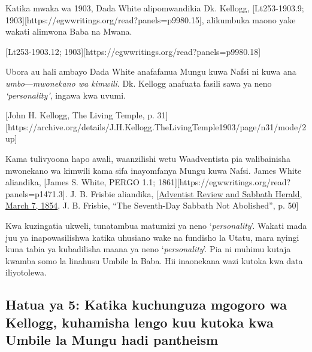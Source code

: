Katika mwaka wa 1903, Dada White alipomwandikia Dk. Kellogg, [Lt253-1903.9; 1903][https://egwwritings.org/read?panels=p9980.15], alikumbuka maono yake wakati alimwona Baba na Mwana.


[Lt253-1903.12; 1903][https://egwwritings.org/read?panels=p9980.18]


Ubora au hali ambayo Dada White anafafanua Mungu kuwa Nafsi ni kuwa ana \textit{umbo}—\textit{mwonekano wa kimwili}. Dk. Kellogg anafuata fasili sawa ya neno \textit{‘personality’}, ingawa kwa uvumi.


[John H. Kellogg, The Living Temple, p. 31][https://archive.org/details/J.H.Kellogg.TheLivingTemple1903/page/n31/mode/2up]


Kama tulivyoona hapo awali, waanzilishi wetu Waadventista pia walibainisha mwonekano wa kimwili kama sifa inayomfanya Mungu kuwa Nafsi. James White aliandika, [James S. White, PERGO 1.1; 1861][https://egwwritings.org/read?panels=p1471.3]. J. B. Frisbie aliandika, [\href{https://documents.adventistarchives.org/Periodicals/RH/RH18540307-V05-07.pdf}{Adventist Review and Sabbath Herald, March 7, 1854}, J. B. Frisbie, “The Seventh-Day Sabbath Not Abolished”, p. 50]


Kwa kuzingatia ukweli, tunatambua matumizi ya neno ‘\textit{personality}’. Wakati mada juu ya  inapowasilishwa katika uhusiano wake na fundisho la Utatu, mara nyingi kuna tabia ya kubadilisha maana ya neno ‘\textit{personality}’. Pia ni muhimu kutaja kwamba somo la  linahusu Umbile la Baba. Hii inaonekana wazi kutoka kwa data iliyotolewa.


\subsection*{Hatua ya 5: Katika kuchunguza mgogoro wa Kellogg, kuhamisha lengo kuu kutoka kwa Umbile la Mungu hadi pantheism}


